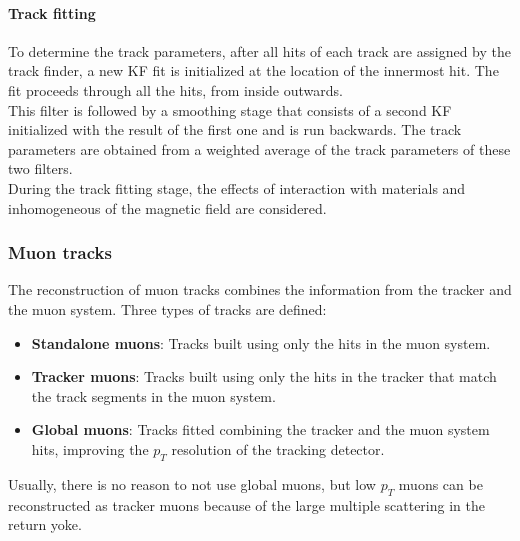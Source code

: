 \paragraph*{Track fitting}
To determine the track parameters, after all hits of each track are assigned by the track finder, a new KF fit is initialized at the location of the innermost hit. The fit proceeds through all the hits, from inside outwards.\\
This filter is followed by a smoothing stage that consists of a second KF initialized with the result of the first one and is run backwards. The track parameters are obtained from a weighted average of the track parameters of these two filters.\\
During the track fitting stage, the effects of interaction with materials and  inhomogeneous of the magnetic field are considered.


\subsubsection*{Muon tracks}
The reconstruction of muon tracks combines the information from the tracker and the muon system. Three types of tracks are defined:
\begin{itemize}
    \item \textbf{Standalone muons}: Tracks built using only the hits in the muon system.
    \item \textbf{Tracker muons}: Tracks built using only the hits in the tracker that match the track segments in the muon system.
    \item \textbf{Global muons}: Tracks fitted combining the tracker and the muon system hits, improving the $p_T$ resolution of the tracking detector.
\end{itemize}
Usually, there is no reason to not use global muons, but low $p_T$ muons can be reconstructed as tracker muons because of the large multiple scattering in the return yoke. 

